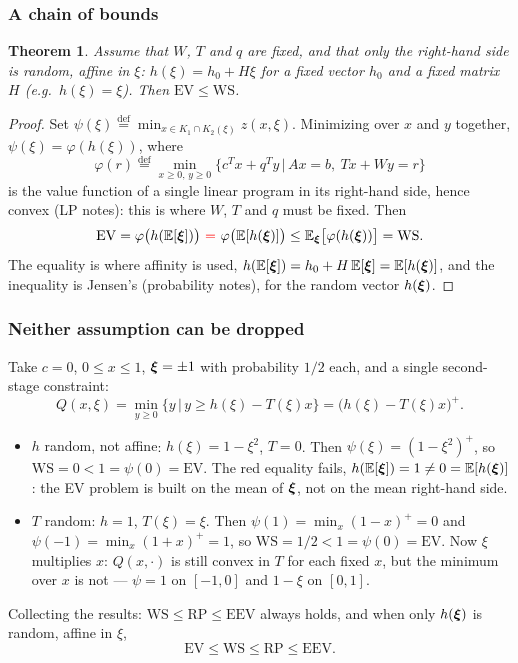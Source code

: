 \documentclass[aspectratio=169]{beamer}
\newtheorem{theo}{Theorem}
\newcommand{\WS}{\mathrm{WS}}
\newcommand{\RP}{\mathrm{RP}}
\newcommand{\EV}{\mathrm{EV}}
\newcommand{\EEV}{\mathrm{EEV}}
\begin{document}
\begin{frame}
\frametitle{A chain of bounds}
\small

\begin{theo}
Assume that $W$, $T$ and $q$ are fixed, and that only the right-hand side is random, {\red affine} in $\xi$: $h(\xi) = h_0 + H\xi$ for a fixed vector $h_0$ and a fixed matrix $H$ (e.g.\ $h(\xi) = \xi$).
Then $\EV \leq \WS$.
\end{theo}
\begin{proof}
Set $\psi(\xi) \overset{\mathrm{def}}{=} \min_{x \in K_1 \cap K_2(\xi)} z(x,\xi)$.
Minimizing over $x$ and $y$ together, $\psi(\xi) = \varphi(h(\xi))$, where
\[
\varphi(r) \overset{\mathrm{def}}{=} \min_{x \geq 0,\, y \geq 0} \lbrace c^Tx + q^Ty \,|\, Ax = b,\ Tx + Wy = r \rbrace
\]
is the value function of a single linear program in its right-hand side, hence convex (LP notes): this is where $W$, $T$ and $q$ must be fixed. Then
\[
\EV = \varphi\big(h(\EE[\bsxi])\big) \ {\red =}\ \varphi\big(\EE[h(\bsxi)]\big) \leq \EE_{\bsxi}\big[\varphi(h(\bsxi))\big] = \WS.
\]
The {\red equality} is where affinity is used, $h({\mathbb{E}}[{\boldsymbol{\xi}}]) = h_0 + H\,{\mathbb{E}}[{\boldsymbol{\xi}}] = {\mathbb{E}}[h({\boldsymbol{\xi}})]$, and the inequality is Jensen's (probability notes), for the random vector $h({\boldsymbol{\xi}})$.
\end{proof}
\end{frame}

\begin{frame}
\frametitle{Neither assumption can be dropped}
\small

Take $c = 0$, $0 \leq x \leq 1$, ${\boldsymbol{\xi}} = \pm 1$ with probability $1/2$ each, and a single second-stage constraint:
\[
Q(x,\xi) = \min_{y \geq 0} \lbrace y \,|\, y \geq h(\xi) - T(\xi)x \rbrace = \big(h(\xi) - T(\xi)x\big)^+.
\]
\begin{itemize}
\item
{\blue $h$ random, not affine}: $h(\xi) = 1 - \xi^2$, $T = 0$.
Then $\psi(\xi) = (1-\xi^2)^+$, so $\WS = 0 < 1 = \psi(0) = \EV$.
The red equality fails, $h({\mathbb{E}}[{\boldsymbol{\xi}}]) = 1 \neq 0 = {\mathbb{E}}[h({\boldsymbol{\xi}})]$: the EV problem is built on the mean of ${\boldsymbol{\xi}}$, not on the mean right-hand side.
\item
{\blue $T$ random}: $h = 1$, $T(\xi) = \xi$.
Then $\psi(1) = \min_x (1-x)^+ = 0$ and $\psi(-1) = \min_x (1+x)^+ = 1$, so $\WS = 1/2 < 1 = \psi(0) = \EV$.
Now $\xi$ multiplies $x$: $Q(x,\cdot)$ is still convex in $T$ for each fixed $x$, but the minimum over $x$ is not --- $\psi = 1$ on $[-1,0]$ and $1-\xi$ on $[0,1]$.
\end{itemize}
Collecting the results: $\WS \leq \RP \leq \EEV$ always holds, and when only $h({\boldsymbol{\xi}})$ is random, affine in $\xi$,
\[
\EV \leq \WS \leq \RP \leq \EEV.
\]
\end{frame}
\end{document}
